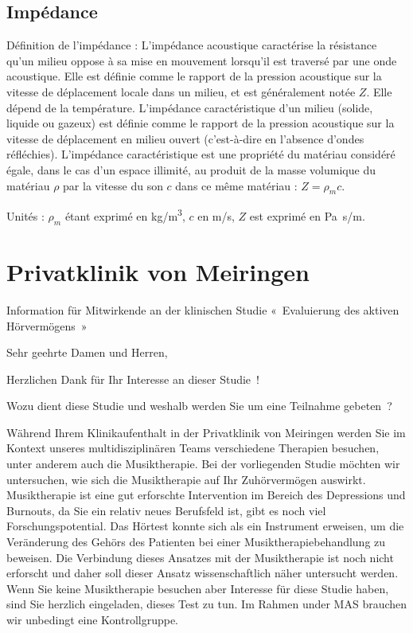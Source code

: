 \section{Impédance}
\label{impedance}

Définition de l'impédance : L'impédance acoustique
caractérise la résistance qu'un milieu oppose à sa mise en mouvement
lorsqu'il est traversé par une onde acoustique. Elle est définie comme
le rapport de la pression acoustique sur la vitesse de déplacement
locale dans un milieu, et est généralement notée $Z$. Elle dépend de
la température. L'impédance caractéristique d'un milieu (solide, liquide
ou gazeux) est définie comme le rapport de la pression acoustique
sur la vitesse de déplacement en milieu ouvert (c'est-à-dire
en l'absence d'ondes réfléchies). L'impédance caractéristique est
une propriété du matériau considéré égale, dans le cas d'un espace
illimité, au produit de la masse volumique du matériau $\rho$
par la vitesse du son $c$ dans ce même matériau : $Z = \rho_{m} c$.

Unités : $\rho_{m}$ étant exprimé en \si{kg/m\cubed},
$c$ en \si{m/s}, $Z$ est
exprimé en \si{\pascal . s/m}.

\chapter{Privatklinik von Meiringen}



Information für Mitwirkende an der klinischen Studie
« Evaluierung des aktiven Hörvermögens »


Sehr geehrte Damen und Herren,

Herzlichen Dank für Ihr Interesse an dieser Studie !

Wozu dient diese Studie und weshalb werden Sie um eine Teilnahme gebeten ?

Während Ihrem Klinikaufenthalt  in der Privatklinik von Meiringen werden Sie im Kontext 
unseres multidisziplinären Teams verschiedene Therapien besuchen, unter anderem auch die Musiktherapie. Bei der vorliegenden Studie möchten wir untersuchen, wie sich die Musiktherapie auf Ihr Zuhörvermögen auswirkt.
Musiktherapie ist eine gut erforschte Intervention im Bereich des Depressions und Burnouts, da Sie ein relativ neues Berufsfeld ist, gibt es noch viel Forschungspotential.
Das Hörtest konnte sich als ein Instrument erweisen, um die Veränderung des Gehörs des Patienten bei einer Musiktherapiebehandlung zu beweisen. Die Verbindung dieses Ansatzes mit der Musiktherapie ist noch nicht erforscht und daher soll dieser Ansatz wissenschaftlich näher untersucht werden.
Wenn Sie keine Musiktherapie besuchen aber Interesse für diese Studie haben, sind Sie herzlich eingeladen, dieses Test zu tun. Im Rahmen under MAS brauchen wir unbedingt eine Kontrollgruppe.

